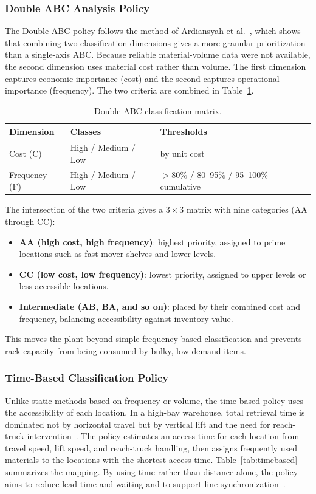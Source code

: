 \documentclass[12pt,a4paper]{article}
\begin{document}
\subsubsection{Double ABC Analysis Policy}
The Double ABC policy follows the method of
Ardiansyah et al.~\cite{ardiansyah2024}, which shows that combining two
classification dimensions gives a more granular prioritization than a
single-axis ABC. Because reliable material-volume data were not available,
the second dimension uses material cost rather than volume. The first
dimension captures economic importance (cost) and the second captures
operational importance (frequency). The two criteria are combined in
Table~\ref{tab:doubleabc}.

\begin{table}[htbp]
\centering
\caption{Double ABC classification matrix.}
\label{tab:doubleabc}
\begin{tabular}{lll}
\toprule
Dimension & Classes & Thresholds \\
\midrule
Cost (C) & High / Medium / Low & by unit cost \\
Frequency (F) & High / Medium / Low & $>80\%$ / 80--95\% / 95--100\% cumulative \\
\bottomrule
\end{tabular}
\end{table}

The intersection of the two criteria gives a $3 \times 3$ matrix with nine
categories (AA through CC):
\begin{itemize}
\item \textbf{AA (high cost, high frequency)}: highest priority, assigned to
prime locations such as fast-mover shelves and lower levels.
\item \textbf{CC (low cost, low frequency)}: lowest priority, assigned to
upper levels or less accessible locations.
\item \textbf{Intermediate (AB, BA, and so on)}: placed by their combined cost
and frequency, balancing accessibility against inventory value.
\end{itemize}
This moves the plant beyond simple frequency-based classification and prevents
rack capacity from being consumed by bulky, low-demand items.

\subsubsection{Time-Based Classification Policy}
Unlike static methods based on frequency or volume, the time-based policy uses
the accessibility of each location. In a high-bay warehouse, total retrieval
time is dominated not by horizontal travel but by vertical lift and the need
for reach-truck intervention~\cite{bartholdi2014,heskett1963}. The policy
estimates an access time for each location from travel speed, lift speed, and
reach-truck handling, then assigns frequently used materials to the locations
with the shortest access time. Table~\ref{tab:timebased} summarizes the
mapping. By using time rather than distance alone, the policy aims to reduce
lead time and waiting and to support line synchronization~\cite{petersen2004,limere2012}.
\end{document}
